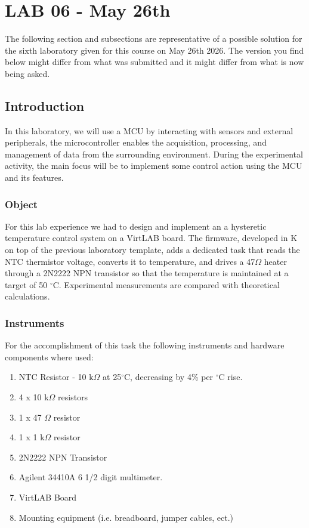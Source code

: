 \documentclass[../main.tex]{subfiles}
\begin{document}
\clearpage
\thispagestyle{empty}
\vspace*{7cm}
\section{LAB 06 - May 26th}
\vspace*{1.5cm}


The following section and subsections are representative of a possible solution for the sixth laboratory given for this course on May 26th 2026.
The version you find below might differ from what was submitted and it might differ from what is now being asked. 


\vspace*{1cm}
\subsection{Introduction}

In this laboratory, we will use a MCU by interacting with sensors and external peripherals, the microcontroller enables the acquisition, processing, and management of data from the surrounding environment. During the experimental activity, the main focus will be to implement some control action using the MCU and its features.

\subsubsection*{Object}

For this lab experience we had to design and implement an a hysteretic temperature control system on a VirtLAB board. 
The firmware, developed in K on top of the previous laboratory template, adds a dedicated task that reads the NTC thermistor voltage, converts it to temperature, and drives a 47$\Omega$ heater through a 2N2222 NPN transistor so that the temperature is maintained at a target of 50 $^\circ$C. 
Experimental measurements are compared with theoretical calculations.

\subsubsection*{Instruments} 

For the accomplishment of this task the following instruments and hardware components where used:

\begin{enumerate}[label=\textbf{-}]
	\item NTC Resistor - 10 k$\Omega$ at 25$^\circ$C, decreasing by 4\% per $^\circ$C rise.
	\item 4 x 10 k$\Omega$ resistors
	\item 1 x 47 $\Omega$ resistor
	\item 1 x 1 k$\Omega$ resistor
	\item 2N2222 NPN Transistor
	\item Agilent 34410A 6 1/2 digit multimeter.
	\item VirtLAB Board
	\item Mounting equipment (i.e. breadboard, jumper cables, ect.)
\end{enumerate}
\end{document}

